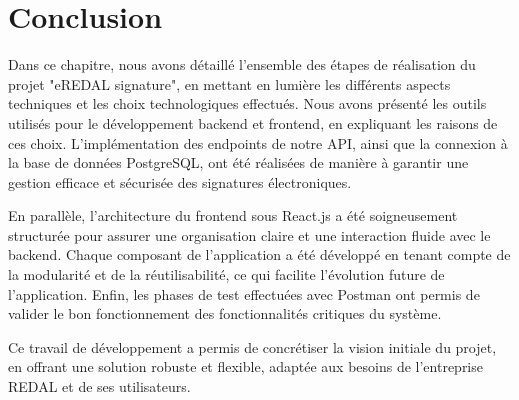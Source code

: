\section{Conclusion}
\quad Dans ce chapitre, nous avons détaillé l'ensemble des étapes de réalisation du projet "eREDAL signature", en mettant en lumière les différents aspects techniques et les choix technologiques effectués. Nous avons présenté les outils utilisés pour le développement backend et frontend, en expliquant les raisons de ces choix. L'implémentation des endpoints de notre API, ainsi que la connexion à la base de données PostgreSQL, ont été réalisées de manière à garantir une gestion efficace et sécurisée des signatures électroniques.

En parallèle, l'architecture du frontend sous React.js a été soigneusement structurée pour assurer une organisation claire et une interaction fluide avec le backend. Chaque composant de l'application a été développé en tenant compte de la modularité et de la réutilisabilité, ce qui facilite l'évolution future de l'application. Enfin, les phases de test effectuées avec Postman ont permis de valider le bon fonctionnement des fonctionnalités critiques du système.

Ce travail de développement a permis de concrétiser la vision initiale du projet, en offrant une solution robuste et flexible, adaptée aux besoins de l'entreprise REDAL et de ses utilisateurs.
